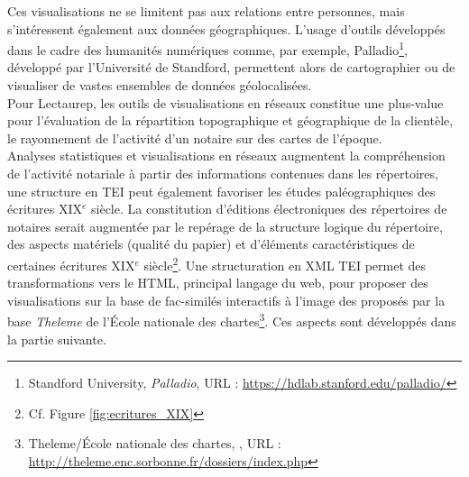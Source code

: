 Ces visualisations ne se limitent pas aux relations entre personnes, mais s'intéressent également aux données géographiques. L'usage d'outils développés dans le cadre des humanités numériques comme, par exemple, Palladio\footnote{Standford University, \textit{Palladio}, URL :  \url{https://hdlab.stanford.edu/palladio/}}, développé par l'Université de Standford, permettent alors de cartographier ou de visualiser de vastes ensembles de données géolocalisées.\\

Pour Lectaurep, les outils de visualisations en réseaux constitue une plus-value pour l'évaluation de la répartition topographique et géographique de la clientèle, le rayonnement de l'activité d'un notaire sur des cartes de l'époque.\\

Analyses statistiques et visualisations en réseaux augmentent la compréhension de l'activité notariale à partir des informations contenues dans les répertoires, une structure en TEI peut également favoriser les études paléographiques des écritures XIX$^{e}$ siècle. La constitution d'éditions électroniques des répertoires de notaires serait augmentée par le repérage de la structure logique du répertoire, des aspects matériels (qualité du papier) et d'éléments caractéristiques de certaines écritures XIX$^{e}$ siècle\footnote{Cf. Figure \ref{fig:ecritures_XIX}}. Une structuration en XML TEI permet des transformations vers le HTML, principal langage du web, pour proposer des visualisations sur la base de fac-similés interactifs à l'image des  proposés par la base \textit{Theleme} de l'École nationale des chartes\footnote{Theleme/École nationale des chartes, , URL : \url{http://theleme.enc.sorbonne.fr/dossiers/index.php}}. Ces aspects sont développés dans la partie suivante.
\newpage
\thispagestyle{empty}

